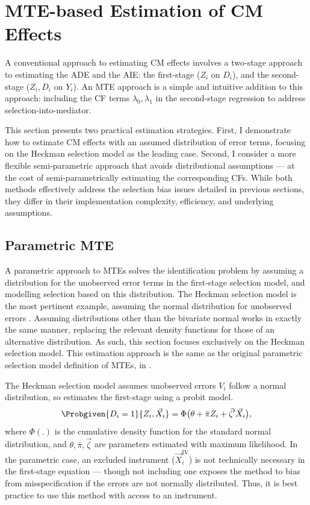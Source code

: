 \section{MTE-based Estimation of CM Effects}
\label{sec:controlfun}
A conventional approach to estimating CM effects involves a two-stage approach to estimating the ADE and the AIE: the first-stage ($Z_i$ on $D_i$), and the second-stage ($Z_i, D_i$ on $Y_i$).
An MTE approach is a simple and intuitive addition to this approach: including the CF terms $\lambda_0, \lambda_1$ in the second-stage regression to address selection-into-mediator.

This section presents two practical estimation strategies.
First, I demonstrate how to estimate CM effects with an assumed distribution of error terms, focusing on the Heckman selection model as the leading case.
Second, I consider a more flexible semi-parametric approach that avoids distributional assumptions --- at the cost of semi-parametrically estimating the corresponding CFs.
While both methods effectively address the selection bias issues detailed in previous sections, they differ in their implementation complexity, efficiency, and underlying assumptions.

\subsection{Parametric MTE}
A parametric approach to MTEs solves the identification problem by assuming a distribution for the unobserved error terms in the first-stage selection model, and modelling selection based on this distribution.
The Heckman selection model is the most pertinent example, assuming the normal distribution for unobserved errors \citep{heckman1979sample}.
Assuming distributions other than the bivariate normal works in exactly the same manner, replacing the relevant density functions for those of an alternative distribution.
As such, this section focuses exclusively on the Heckman selection model.
This estimation approach is the same as the original parametric selection model definition of MTEs, in \cite{bjorklund1987estimation}.

The Heckman selection model assumes unobserved errors $V_i$ follow a normal distribution, so estimates the first-stage using a probit model.
\[ \Probgiven{D_i = 1}{Z_i, \vec X_i}
    = \Phi \big( \theta + \bar\pi Z_i + \vec\zeta' \vec X_i \big), \]
where $\Phi(.)$ is the cumulative density function for the standard normal distribution, and $\theta, \bar\pi, \vec\zeta$ are parameters estimated with maximum likelihood.
In the parametric case, an excluded instrument ($\vec X_i^{\text{IV}}$) is not technically necessary in the first-stage equation --- though not including one exposes the method to bias from misspecification if the errors are not normally distributed.
Thus, it is best practice to use this method with access to an instrument.

